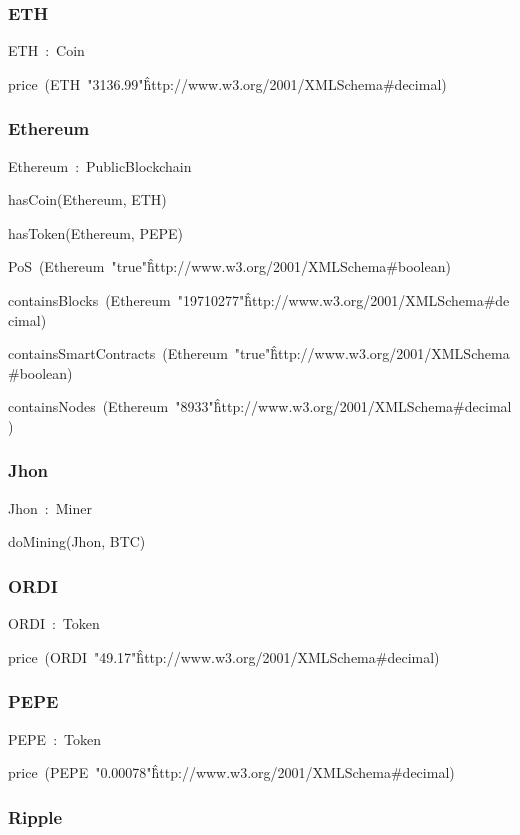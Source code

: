 \documentclass{article}
\begin{document}
\subsubsection*{ETH}

ETH~:~Coin

price~(ETH~"3136.99"\^\^http://www.w3.org/2001/XMLSchema#decimal)

\subsubsection*{Ethereum}

Ethereum~:~PublicBlockchain

hasCoin(Ethereum, ETH)

hasToken(Ethereum, PEPE)

PoS~(Ethereum~"true"\^\^http://www.w3.org/2001/XMLSchema#boolean)

containsBlocks~(Ethereum~"19710277"\^\^http://www.w3.org/2001/XMLSchema#decimal)

containsSmartContracts~(Ethereum~"true"\^\^http://www.w3.org/2001/XMLSchema#boolean)

containsNodes~(Ethereum~"8933"\^\^http://www.w3.org/2001/XMLSchema#decimal)

\subsubsection*{Jhon}

Jhon~:~Miner

doMining(Jhon, BTC)

\subsubsection*{ORDI}

ORDI~:~Token

price~(ORDI~"49.17"\^\^http://www.w3.org/2001/XMLSchema#decimal)

\subsubsection*{PEPE}

PEPE~:~Token

price~(PEPE~"0.00078"\^\^http://www.w3.org/2001/XMLSchema#decimal)

\subsubsection*{Ripple}
\end{document}
